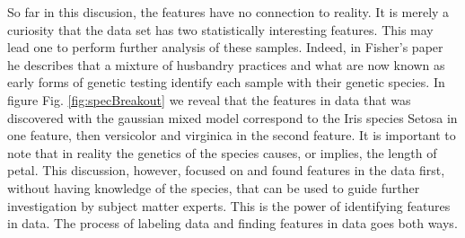 So far in this discusion, the features have no connection to reality. It is merely a curiosity that the data set has two statistically interesting features. This may lead one to perform further analysis of these samples. Indeed, in Fisher's paper \cite{Iris:Fisher} he describes that a mixture of husbandry practices and what are now known as early forms of genetic testing identify each sample with their genetic species. In figure Fig. \ref{fig:specBreakout} we reveal that the features in data that was discovered with the gaussian mixed model correspond to the Iris species Setosa in one feature, then versicolor and virginica in the second feature. It is important to note that in reality the genetics of the species causes, or implies, the length of petal. This discussion, however, focused on and found features in the data first, without having knowledge of the species, that can be used to guide further investigation by subject matter experts. This is the power of identifying features in data. The process of labeling data and finding features in data goes both ways.

